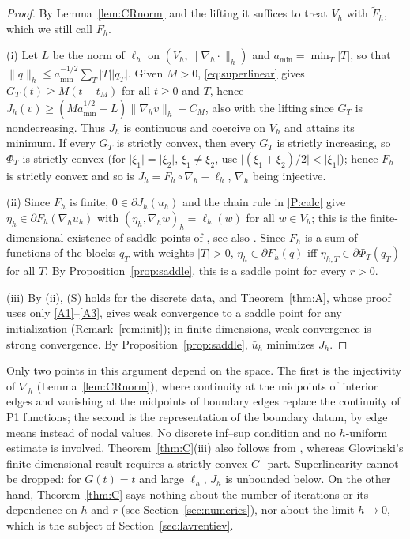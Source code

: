\documentclass[11pt]{amsart}
\theoremstyle{definition}
\theoremstyle{remark}
\numberwithin{equation}{section}
\newcommand{\abs}[1]{\lvert #1\rvert}
\newcommand{\norm}[1]{\lVert #1\rVert}
\begin{document}
\begin{proof}
By Lemma~\ref{lem:CRnorm} and the lifting it suffices to treat $V_h$ with $\tilde F_h$, which we still call $F_h$.


(i) Let $L$ be the norm of $\ell_h$ on $(V_h,\norm{\nabla_h\cdot}_h)$ and $a_{\min}=\min_T\abs T$, so that $\norm q_h\le a_{\min}^{-1/2}\sum_T\abs T\abs{q_T}$. Given $M>0$, \eqref{eq:superlinear} gives $G_T(t)\ge M(t-t_M)$ for all $t\ge0$ and $T$, hence $J_h(v)\ge(Ma_{\min}^{1/2}-L)\norm{\nabla_hv}_h-C_M$, also with the lifting since $G_T$ is nondecreasing. Thus $J_h$ is continuous and coercive on $V_h$ and attains its minimum. If every $G_T$ is strictly convex, then every $G_T$ is strictly increasing, so $\Phi_T$ is strictly convex (for $\abs{\xi_1}=\abs{\xi_2}$, $\xi_1\ne\xi_2$, use $\abs{(\xi_1+\xi_2)/2}<\abs{\xi_1}$); hence $F_h$ is strictly convex and so is $J_h=F_h\circ\nabla_h-\ell_h$, $\nabla_h$ being injective.


(ii) Since $F_h$ is finite, $0\in\partial J_h(u_h)$ and the chain rule in \ref{P:calc} give $\eta_h\in\partial F_h(\nabla_hu_h)$ with $(\eta_h,\nabla_hw)_h=\ell_h(w)$ for all $w\in V_h$; this is the finite-dimensional existence of saddle points of \cite[Ch.~VI, \S4.2]{Glowinski1984ChVI}, see also \cite[Rem.~3.1]{BartelsMilicevic2017}. Since $F_h$ is a sum of functions of the blocks $q_T$ with weights $\abs T>0$, $\eta_h\in\partial F_h(q)$ iff $\eta_{h,T}\in\partial\Phi_T(q_T)$ for all $T$. By Proposition~\ref{prop:saddle}, this is a saddle point for every $r>0$.

(iii) By (ii), (S) holds for the discrete data, and Theorem~\ref{thm:A}, whose proof uses only \ref{A1}--\ref{A3}, gives weak convergence to a saddle point for any initialization (Remark~\ref{rem:init}); in finite dimensions, weak convergence is strong convergence. By Proposition~\ref{prop:saddle}, $\bar u_h$ minimizes $J_h$.
\end{proof}

Only two points in this argument depend on the space. The first is the injectivity of $\nabla_h$ (Lemma~\ref{lem:CRnorm}), where continuity at the midpoints of interior edges and vanishing at the midpoints of boundary edges replace the continuity of P1 functions; the second is the representation of the boundary datum, by edge means instead of nodal values. No discrete inf--sup condition and no $h$-uniform estimate is involved. Theorem~\ref{thm:C}(iii) also follows from \cite[Thm.~8]{EcksteinBertsekas1992}, whereas Glowinski's finite-dimensional result \cite[Ch.~VI, Thm.~5.2]{Glowinski1984ChVI} requires a strictly convex $C^1$ part. Superlinearity cannot be dropped: for $G(t)=t$ and large $\ell_h$, $J_h$ is unbounded below. On the other hand, Theorem~\ref{thm:C} says nothing about the number of iterations or its dependence on $h$ and $r$ (see Section~\ref{sec:numerics}), nor about the limit $h\to0$, which is the subject of Section~\ref{sec:lavrentiev}.
\end{document}
